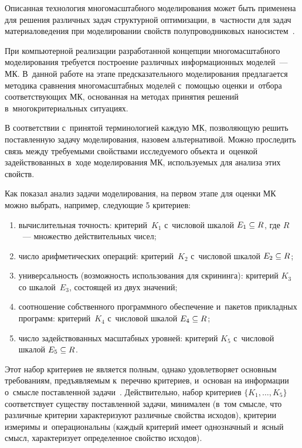 \begin{multicols}{2}
   Описанная технология многомасштабного моделирования может быть 
применена для решения различных задач структурной оптимизации, в~частности 
для задач материаловедения при моделировании свойств полупроводниковых 
наносистем~\cite{3-ab, 4-ab, 5-ab}.
   
   При компьютерной реализации разработанной концепции многомасштабного 
моделирования требуется построение различных информационных моделей~--- 
МК. В~данной работе на этапе предсказательного 
моделирования предлагается методика сравнения многомасштабных моделей 
с~помощью оценки и~отбора соответствующих МК, основанная на методах 
принятия решений в~многокритериальных ситуациях.
   
   В соответствии с~принятой терминологией каж\-дую МК, позволяющую решить 
поставленную задачу моделирования, назовем альтернативой. Можно проследить 
связь между требуемыми свойствами исследуемого объекта и~оценкой 
задействованных в~ходе моделирования МК, 
используемых для анализа этих свойств.
   
   Как показал анализ задачи моделирования, на первом этапе для оценки МК 
можно выбрать, например, следующие 5 критериев:
   \begin{enumerate}[(1)]
   \item вычислительная точность: критерий~$K_1$ с~чис\-ло\-вой шкалой 
$E_1\hm\subseteq R$, где $R$~--- множество действительных чисел;
   \item число арифметических операций: критерий~$K_2$ с~числовой шкалой 
$E_2\hm\subseteq R$;
   \item универсальность (возможность использования для скрининга): критерий 
$K_3$ со шкалой~$E_3$, состоящей из двух значений;
   \item соотношение собственного программного обеспечение и~пакетов 
прикладных программ: критерий~$K_4$ с~числовой шкалой $E_4\hm\subseteq R$;
   \item число задействованных масштабных уровней: критерий $K_5$ 
с~числовой шкалой $E_5\hm\subseteq R$.
   \end{enumerate}
   
   Этот набор критериев не является полным, однако удовлетворяет основным 
требованиям, предъявляемым к~перечню критериев, и~основан на информации 
о~смысле поставленной задачи~\cite{6-ab}.\linebreak
 Действительно, набор критериев 
$\{K_1,\ldots ,K_5\}$\linebreak соответствует существу поставленной задачи, минимален 
(в~том смысле, что различные критерии характеризуют различные свойства 
исходов), критерии измеримы и~операциональны (каждый критерий имеет 
однозначный и~ясный смысл, характеризует определенное свойство исходов).
   

\end{multicols}
